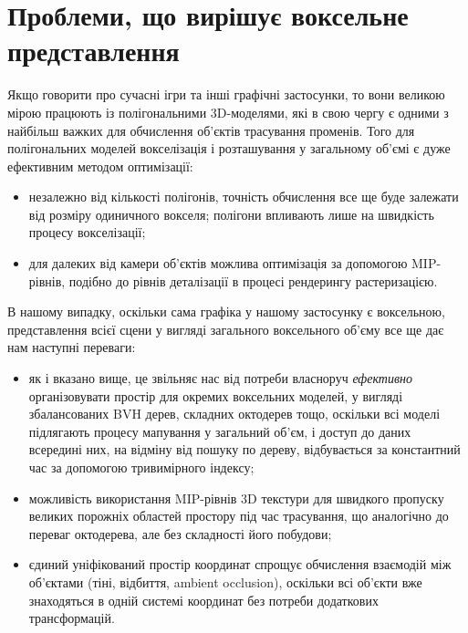 \section{Проблеми, що вирішує воксельне представлення}

Якщо говорити про сучасні ігри та інші графічні застосунки, то вони великою мірою працюють із полігональними 3D-моделями, які в свою чергу є одними з найбільш важких для обчислення об'єктів трасування променів. Того для полігональних моделей вокселізація і розташування у загальному об'ємі є дуже ефективним методом оптимізації:
\begin{itemize}[itemsep=0pt, topsep=0pt, label=$\diamond$]
    \item незалежно від кількості полігонів, точність обчислення все ще буде залежати від розміру одиничного вокселя; полігони впливають лише на швидкість процесу вокселізації;
    \item для далеких від камери об'єктів можлива оптимізація за допомогою MIP-рівнів, подібно до рівнів деталізації  в процесі рендерингу растеризацією.
\end{itemize}

\begin{figure}[ht]
    \centering
    
    \caption{}
    \label{fig:monkey}
\end{figure}

В нашому випадку, оскільки сама графіка у нашому застосунку є воксельною, представлення всієї сцени у вигляді загального воксельного об'єму все ще дає нам наступні переваги:
\begin{itemize}[itemsep=0pt, topsep=0pt, label=$\diamond$]
    \item як і вказано вище, це звільняє нас від потреби власноруч \textit{ефективно} організовувати простір для окремих воксельних моделей, у вигляді збалансованих BVH дерев, складних октодерев тощо, оскільки всі моделі підлягають процесу мапування у загальний об'єм, і доступ до даних всередині них, на відміну від пошуку по дереву, відбувається за константний час за допомогою тривимірного індексу;
    \item можливість використання MIP-рівнів 3D текстури для швидкого пропуску великих порожніх областей простору під час трасування, що аналогічно до переваг октодерева, але без складності його побудови;
    \item єдиний уніфікований простір координат спрощує обчислення взаємодій між об'єктами (тіні, відбиття, ambient occlusion), оскільки всі об'єкти вже знаходяться в одній системі координат без потреби додаткових трансформацій.
\end{itemize}

